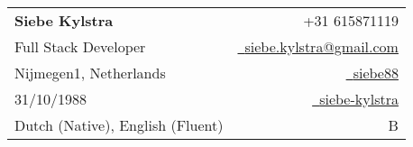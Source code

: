 
\begin{tabularx}{\linewidth}{L r} \\
  \textbf{\Large Siebe Kylstra} & {\raisebox{0.0\height}{\footnotesize \faPhone}\ +31 615871119}\\
  {Full Stack Developer} & \href{mailto:siebe.kylstra@gmail.com}{\raisebox{0.0\height}{\footnotesize \faEnvelope}\ {siebe.kylstra@gmail.com}} \\
  {Nijmegen1, Netherlands} & \href{https://github.com/siebe88}{\raisebox{0.0\height}{\footnotesize \faGithub}\ {siebe88}} \\
  {31/10/1988} & \href{https://linkedin.com/in/siebe-kylstra}{\raisebox{0.0\height}{\footnotesize \faLinkedin}\ {siebe-kylstra}} \\
  {Dutch (Native), English (Fluent)} & {\raisebox{0.0\height}{\footnotesize \faCar}\ B}
\end{tabularx}
